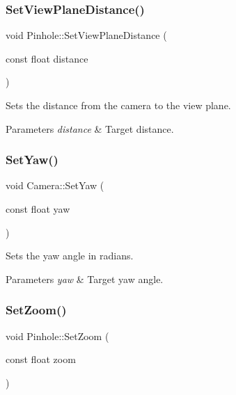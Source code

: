 \subsubsection{\texorpdfstring{Set\+View\+Plane\+Distance()}{SetViewPlaneDistance()}\hspace{0.1cm}{\footnotesize\ttfamily [2/2]}}
{\footnotesize\ttfamily void Pinhole\+::\+Set\+View\+Plane\+Distance (\begin{DoxyParamCaption}\item[{const float}]{distance }\end{DoxyParamCaption})\hspace{0.3cm}{\ttfamily [inline]}}

Sets the distance from the camera to the view plane. 
\begin{DoxyParams}{Parameters}
{\em distance} & Target distance. \\
\hline
\end{DoxyParams}
\hypertarget{group___cameras_ga0e499019f7cd3029602461fcd63aa40c}{}\label{group___cameras_ga0e499019f7cd3029602461fcd63aa40c} 
\subsubsection{\texorpdfstring{Set\+Yaw()}{SetYaw()}}
{\footnotesize\ttfamily void Camera\+::\+Set\+Yaw (\begin{DoxyParamCaption}\item[{const float}]{yaw }\end{DoxyParamCaption})\hspace{0.3cm}{\ttfamily [inline]}}

Sets the yaw angle in radians. 
\begin{DoxyParams}{Parameters}
{\em yaw} & Target yaw angle. \\
\hline
\end{DoxyParams}
\hypertarget{group___cameras_ga9baed583b61d1808867251fa33d4db56}{}\label{group___cameras_ga9baed583b61d1808867251fa33d4db56} 
\subsubsection{\texorpdfstring{Set\+Zoom()}{SetZoom()}\hspace{0.1cm}{\footnotesize\ttfamily [1/2]}}
{\footnotesize\ttfamily void Pinhole\+::\+Set\+Zoom (\begin{DoxyParamCaption}\item[{const float}]{zoom }\end{DoxyParamCaption})\hspace{0.3cm}{\ttfamily [inline]}}

